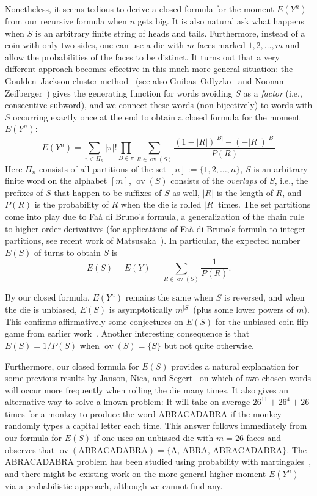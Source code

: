 \documentclass[10pt]{amsart}
\theoremstyle{definition}
\theoremstyle{remark}
\newcommand{\HH}{\mathrm{H}} \newcommand{\TT}{\mathrm{T}}
\DeclareMathOperator{\overlap}{ov}
\begin{document}
Nonetheless, it seems tedious to derive a closed formula for the moment $E(Y^n)$ from our recursive formula when $n$ gets big. %
It is also natural ask what happens when $S$ is an arbitrary finite string of heads and tails.
Furthermore, instead of a coin with only two sides, one can use a die with $m$ faces marked $1,2,\ldots,m$ and allow the probabilities of the faces to be distinct.
It turns out that a very different approach becomes effective in this much more general situation:
the Goulden--Jackson cluster method~\cite{GJ1, GJ2} (see also Guibas--Odlyzko~\cite{GuibasOdlyzko} and Noonan--Zeilberger~\cite{GJ3}) gives the generating function for words avoiding $S$ as a \emph{factor} (i.e., consecutive subword), and we connect these words (non-bijectively) to words with $S$ occurring exactly once at the end to obtain a closed formula for the moment $E(Y^n)$:
\begin{equation}
E(Y^n) = \sum_{\pi\in\Pi_n} |\pi|! \prod_{B\in \pi} \sum_{R\in\overlap(S)} \frac{(1-|R|)^{|B|} - (-|R|)^{|B|}}{P(R)}
\end{equation}
Here $\Pi_n$ consists of all partitions of the set $[n]:=\{1,2,\ldots,n\}$, $S$ is an arbitrary finite word on the alphabet $[m]$, $\overlap(S)$ consists of the \emph{overlaps} of $S$, i.e., the prefixes of $S$ that happen to be suffixes of $S$ as well, $|R|$ is the length of $R$, and $P(R)$ is the probability of $R$ when the die is rolled $|R|$ times.
The set partitions come into play due to Fa\`a di Bruno's formula, a generalization of the chain rule to higher order derivatives (for applications of Fa\`a di Bruno's formula to integer partitions, see recent work of Matsusaka~\cite{Matsusaka}).
In particular, the expected number $E(S)$ of turns to obtain $S$ is 
\begin{equation}
E(S) = E(Y) = \sum_{R\in\overlap(S)} \frac{1}{P(R)}.
\end{equation}


By our closed formula, $E(Y^n)$ remains the same when $S$ is reversed, and when the die is unbiased, $E(S)$ is asymptotically $m^{|S|}$ (plus some lower powers of $m$). 
This confirms affirmatively some conjectures on $E(S)$ for the unbiased coin flip game from earlier work~\cite{Huang}.
Another interesting consequence is that $E(S) = 1/P(S)$ when $\overlap(S)=\{S\}$ but not quite otherwise.

Furthermore, our closed formula for $E(S)$ provides a natural explanation for some previous results by Janson, Nica, and Segert~\cite{JNS} on which of two chosen words will occur more frequently when rolling the die many times.
It also gives an alternative way to solve a known problem: It will take on average $26^{11}+26^4+26$ times for a monkey to produce the word ABRACADABRA if the monkey randomly types a capital letter each time.
This answer follows immediately from our formula for $E(S)$ if one uses an unbiased die with $m=26$ faces and observes that $\overlap(\text{ABRACADABRA}) = \{\text{A, ABRA, ABRACADABRA}\}$.
The ABRACADABRA problem has been studied using probability with martingales~\cite{Lutsko, Williams}, and there might be existing work on the more general higher moment $E(Y^n)$ via a probabilistic approach, although we cannot find any.
\end{document}

